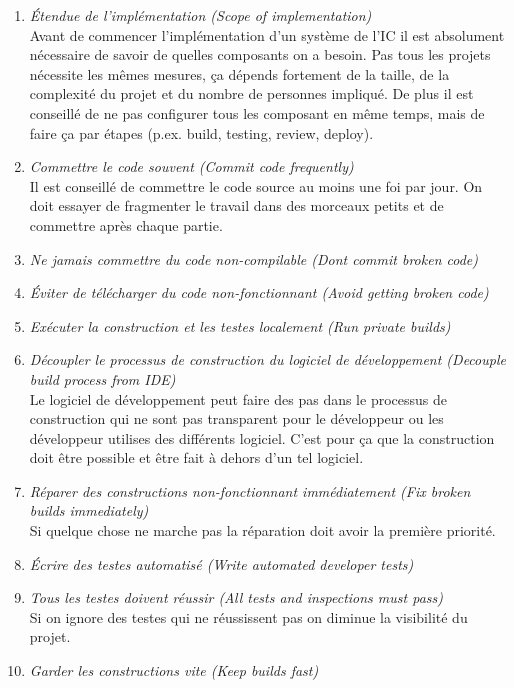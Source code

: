 \begin{enumerate}

\item \textit{Étendue de l'implémentation (Scope of implementation)}\\
Avant de commencer l'implémentation d'un système de l'IC il est absolument nécessaire de savoir de quelles composants on a besoin. Pas tous les projets nécessite les mêmes mesures, ça dépends fortement de la taille, de la complexité du projet et du nombre de personnes impliqué. 
De plus il est conseillé de ne pas configurer tous les composant en même temps, mais de faire ça par étapes (p.ex. build, testing, review, deploy). 

\item\textit{Commettre le code souvent (Commit code frequently)}\\
Il est conseillé de commettre le code source au moins une foi par jour. On doit essayer de fragmenter le travail dans des morceaux petits et de commettre après chaque partie.

\item\textit{Ne jamais commettre du code non-compilable (Dont commit broken code)}

\item\textit{Éviter de télécharger du code non-fonctionnant (Avoid getting broken code)}

\item\textit{Exécuter la construction et les testes localement (Run private builds)}

\item\textit{Découpler le processus de construction du logiciel de développement (Decouple build process from IDE)}\\
Le logiciel de développement peut faire des pas dans le processus de construction qui ne sont pas transparent pour le développeur ou les développeur utilises des différents logiciel. C'est pour ça que la construction doit être possible et être fait à dehors d'un tel logiciel.

\item\textit{Réparer des constructions non-fonctionnant immédiatement (Fix broken builds immediately)}\\
Si quelque chose ne marche pas la réparation doit avoir la première priorité.

\item\textit{Écrire des testes automatisé (Write automated developer tests)}

\item\textit{Tous les testes doivent réussir (All tests and inspections must pass)}\\
Si on ignore des testes qui ne réussissent pas on diminue la visibilité du projet.

\item\textit{Garder les constructions vite (Keep builds fast)}\\

\end{enumerate}